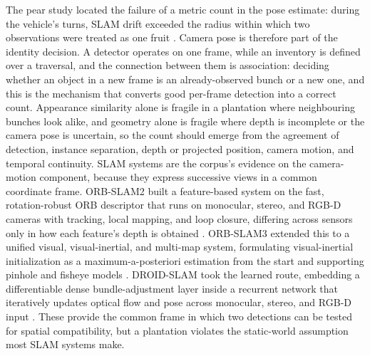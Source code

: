 The pear study located the failure of a metric count in the pose estimate: during the vehicle's turns, SLAM drift exceeded the radius within which two observations were treated as one fruit \cite{ledger_r_d4270ea8ab11f268}. Camera pose is therefore part of the identity decision. A detector operates on one frame, while an inventory is defined over a traversal, and the connection between them is association: deciding whether an object in a new frame is an already-observed bunch or a new one, and this is the mechanism that converts good per-frame detection into a correct count. Appearance similarity alone is fragile in a plantation where neighbouring bunches look alike, and geometry alone is fragile where depth is incomplete or the camera pose is uncertain, so the count should emerge from the agreement of detection, instance separation, depth or projected position, camera motion, and temporal continuity. SLAM systems are the corpus's evidence on the camera-motion component, because they express successive views in a common coordinate frame. ORB-SLAM2 built a feature-based system on the fast, rotation-robust ORB descriptor that runs on monocular, stereo, and RGB-D cameras with tracking, local mapping, and loop closure, differing across sensors only in how each feature's depth is obtained \cite{murartal2017orbslam2}. ORB-SLAM3 extended this to a unified visual, visual-inertial, and multi-map system, formulating visual-inertial initialization as a maximum-a-posteriori estimation from the start and supporting pinhole and fisheye models \cite{campos2021orbslam3}. DROID-SLAM took the learned route, embedding a differentiable dense bundle-adjustment layer inside a recurrent network that iteratively updates optical flow and pose across monocular, stereo, and RGB-D input \cite{teed2021droidslam}. These provide the common frame in which two detections can be tested for spatial compatibility, but a plantation violates the static-world assumption most SLAM systems make.

